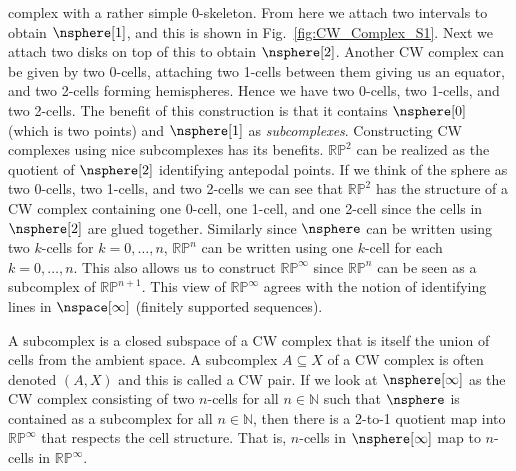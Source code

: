 \documentclass{book}                                                           %
\begin{document}
                complex with a rather simple 0-skeleton. From here we attach two
                intervals to obtain $\nsphere[1]$, and this is shown in
                Fig.~\ref{fig:CW_Complex_S1}. Next we attach two disks on top of
                this to obtain $\nsphere[2]$. Another CW complex can be given by
                two 0-cells, attaching two 1-cells between them giving us an
                equator, and two 2-cells forming hemispheres. Hence we have two
                0-cells, two 1-cells, and two 2-cells. The benefit of this
                construction is that it contains $\nsphere[0]$ (which is two
                points) and $\nsphere[1]$ as \textit{subcomplexes}. Constructing
                CW complexes using nice subcomplexes has its benefits.
                $\mathbb{RP}^{2}$ can be realized as the quotient of
                $\nsphere[2]$ identifying antepodal points. If we think of the
                sphere as two 0-cells, two 1-cells, and two 2-cells we can see
                that $\mathbb{RP}^{2}$ has the structure of a CW complex
                containing one 0-cell, one 1-cell, and one 2-cell since the
                cells in $\nsphere[2]$ are glued together. Similarly since
                $\nsphere$ can be written using two $k$-cells for $k=0,\dots,n$,
                $\mathbb{RP}^{n}$ can be written using one $k$-cell for each
                $k=0,\dots,n$. This also allows us to construct
                $\mathbb{RP}^{\infty}$ since $\mathbb{RP}^{n}$ can be seen as a
                subcomplex of $\mathbb{RP}^{n+1}$. This view of
                $\mathbb{RP}^{\infty}$ agrees with the notion of identifying
                lines in $\nspace[\infty]$ (finitely supported sequences).
                \par\hfill\par
                A subcomplex is a closed subspace of a CW complex that is itself
                the union of cells from the ambient space. A subcomplex
                $A\subseteq{X}$ of a CW complex is often denoted $(A,X)$ and
                this is called a CW pair. If we look at $\nsphere[\infty]$ as
                the CW complex consisting of two $n$-cells for all
                $n\in\mathbb{N}$ such that $\nsphere$ is contained as a
                subcomplex for all $n\in\mathbb{N}$, then there is a 2-to-1
                quotient map into $\mathbb{RP}^{\infty}$ that respects the cell
                structure. That is, $n$-cells in $\nsphere[\infty]$ map to
                $n$-cells in $\mathbb{RP}^{\infty}$.
\end{document}
